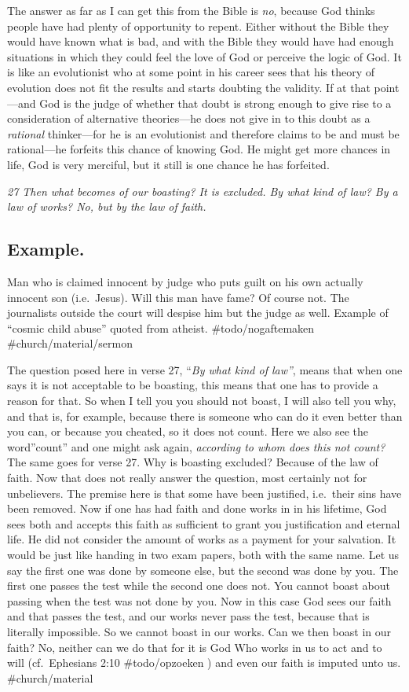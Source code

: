 The answer as far as I can get this from the Bible is \emph{no}, because
God thinks people have had plenty of opportunity to repent. Either
without the Bible they would have known what is bad, and with the Bible
they would have had enough situations in which they could feel the love
of God or perceive the logic of God. It is like an evolutionist who at
some point in his career sees that his theory of evolution does not fit
the results and starts doubting the validity. If at that point---and God
is the judge of whether that doubt is strong enough to give rise to a
consideration of alternative theories---he does not give in to this
doubt as a \emph{rational} thinker---for he is an evolutionist and
therefore claims to be and must be rational---he forfeits this chance of
knowing God. He might get more chances in life, God is very merciful,
but it still is one chance he has forfeited.

\emph{27 Then what becomes of our boasting? It is excluded. By what kind
of law? By a law of works? No, but by the law of faith.}

\subsection{Example.} Man who is claimed innocent by judge who puts guilt on
his own actually innocent son (i.e.~Jesus). Will this man have fame? Of
course not. The journalists outside the court will despise him but the
judge as well. Example of ``cosmic child abuse'' quoted from atheist.
\#todo/nogaftemaken \#church/material/sermon

The question posed here in verse 27, ``\emph{By what kind of law''},
means that when one says it is not acceptable to be boasting, this means
that one has to provide a reason for that. So when I tell you you should
not boast, I will also tell you why, and that is, for example, because
there is someone who can do it even better than you can, or because you
cheated, so it does not count. Here we also see the word''count'' and
one might ask again, \emph{according to whom does this not count?} The
same goes for verse 27. Why is boasting excluded? Because of the law of
faith. Now that does not really answer the question, most certainly not
for unbelievers. The premise here is that some have been justified,
i.e.~their sins have been removed. Now if one has had faith and done
works in in his lifetime, God sees both and accepts this faith as
sufficient to grant you justification and eternal life. He did not
consider the amount of works as a payment for your salvation. It would
be just like handing in two exam papers, both with the same name. Let us
say the first one was done by someone else, but the second was done by
you. The first one passes the test while the second one does not. You
cannot boast about passing when the test was not done by you. Now in
this case God sees our faith and that passes the test, and our works
never pass the test, because that is literally impossible. So we cannot
boast in our works. Can we then boast in our faith? No, neither can we
do that for it is God Who works in us to act and to will (cf.~Ephesians
2:10 \#todo/opzoeken ) and even our faith is imputed unto us.
\#church/material

